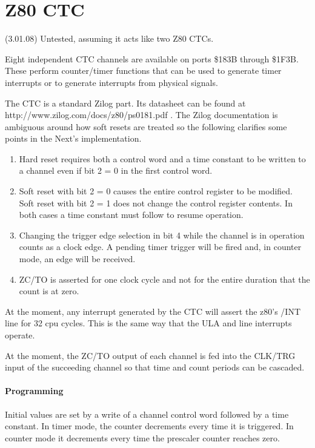 \section{Z80 CTC}
(3.01.08) Untested, assuming it acts like two Z80 CTCs.

Eight independent CTC channels are available on ports \$183B through
\$1F3B.  These perform counter/timer functions that can be used to
generate timer interrupts or to generate interrupts from physical
signals.

The CTC is a standard Zilog part.  Its datasheet can be found at
http://www.zilog.com/docs/z80/ps0181.pdf .  The Zilog documentation is
ambiguous around how soft resets are treated so the following
clarifies some points in the Next's implementation.

\begin{enumerate}
\item Hard reset requires both a control word and a time constant to
  be written to a channel even if bit 2 = 0 in the first control word.
\item Soft reset with bit 2 = 0 causes the entire control register to
  be modified.  Soft reset with bit 2 = 1 does not change the control
  register contents.  In both cases a time constant must follow to
  resume operation.
\item Changing the trigger edge selection in bit 4 while the channel
  is in operation counts as a clock edge.  A pending timer trigger
  will be fired and, in counter mode, an edge will be received.
\item ZC/TO is asserted for one clock cycle and not for the entire
  duration that the count is at zero.
\end{enumerate}
At the moment, any interrupt generated by the CTC will assert the
z80's /INT line for 32 cpu cycles.  This is the same way that the ULA
and line interrupts operate.

At the moment, the ZC/TO output of each channel is fed into the
CLK/TRG input of the succeeding channel so that time and count periods
can be cascaded.

\paragraph{Programming}
Initial values are set by a write of a channel control word followed
by a time constant. In timer mode, the counter decrements every time
it is triggered. In counter mode it decrements every time the
prescaler counter reaches zero.

